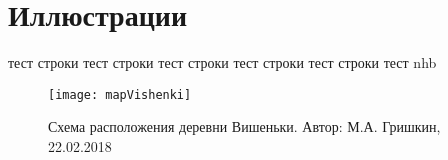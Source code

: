 ﻿\section{Иллюстрации}
тест строки тест строки тест строки тест строки тест строки тест nhb

\begin{figure}[h]
\texttt{[image: mapVishenki]}
\caption{Схема расположения деревни Вишеньки. Автор: М.А. Гришкин, 22.02.2018}
\label{fig:mapVishenki}
\end{figure}

